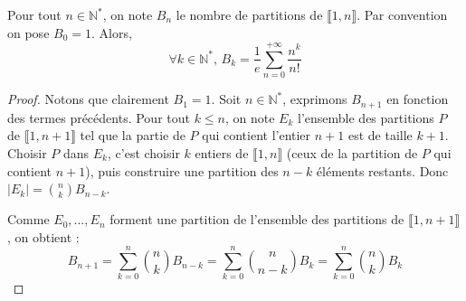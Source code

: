 





	\begin{theorem}
		Pour tout $n \in \mathbb{N}^*$, on note $B_n$ le nombre de partitions de $\llbracket 1, n \rrbracket$. Par convention on pose $B_0 = 1$. Alors,
		\[ \forall k \in \mathbb{N}^*, \, B_k = \frac{1}{e} \sum_{n=0}^{+\infty} \frac{n^k}{n!} \]
	\end{theorem}

	\begin{proof}
		Notons que clairement $B_1 = 1$. Soit $n \in \mathbb{N}^*$, exprimons $B_{n+1}$ en fonction des termes précédents. Pour tout $k \leq n$, on note $E_k$ l'ensemble des partitions $P$ de $\llbracket 1, n+1 \rrbracket$ tel que la partie de $P$ qui contient l'entier $n+1$ est de taille $k+1$. Choisir $P$ dans $E_k$, c'est choisir $k$ entiers de $\llbracket 1, n \rrbracket$ (ceux de la partition de $P$ qui contient $n+1$), puis construire une partition des $n-k$ éléments restants. Donc $|E_k| = \binom{n}{k} B_{n-k}$.

		\medskip
		Comme $E_0, \dots, E_n$ forment une partition de l'ensemble des partitions de $\llbracket 1, n+1 \rrbracket$, on obtient :
		\[ B_{n+1} = \sum_{k=0}^n \binom{n}{k} B_{n-k} = \sum_{k=0}^n \binom{n}{n-k} B_k = \sum_{k=0}^n \binom{n}{k} B_k \tag{$*$} \]


\end{proof}

